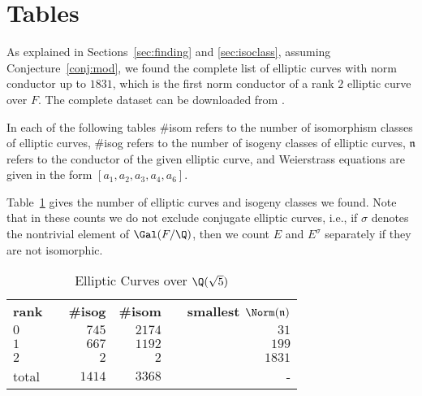 \documentclass{amsart}
\newcommand{\n}{\mathfrak{n}}
\begin{document}
\section{Tables}\label{sec:tables}

As explained in Sections~\ref{sec:finding} and \ref{sec:isoclass},
assuming Conjecture~\ref{conj:mod}, we found the complete list of
elliptic curves with norm conductor up to $1831$, which is the first
norm conductor of a rank $2$ elliptic curve over $F$. The complete
dataset can be downloaded from \cite{sqrt5data}.

In each of the following tables \#isom refers to the number of isomorphism
classes of elliptic curves, \#isog refers to the number of isogeny classes of
elliptic curves, $\n$ refers to the conductor of the given elliptic curve,
and Weierstrass equations are given in the form $[a_1,a_2,a_3,a_4,a_6]$.

Table~\ref{table:total-counts} gives the number of elliptic curves and isogeny
classes we found. Note that in these counts we do not exclude
conjugate elliptic curves, i.e., if $\sigma$ denotes the nontrivial element of
$\Gal(F/\Q)$, then we count $E$ and $E^{\sigma}$ separately if they
are not isomorphic.
\begin{center}
\begin{table}[h]
\caption{Elliptic Curves over $\Q(\sqrt{5})$\label{table:total-counts}}
\begin{tabular}{@{}lcrrcr@{}}\toprule
\textbf{rank} & \phantom{a} &\textbf{\#isog} & \textbf{\#isom} & \phantom{a} & \textbf{smallest $\Norm(\n)$} \\\cmidrule{1-1}\cmidrule{3-4}\cmidrule{6-6}
$0$   & & $745$  & $2174$ & & $31$\\
$1$   & & $667$  & $1192$ & & $199$ \\
$2$   & & $2$    & $2$    & & $1831$ \\\cmidrule{1-6}
total & & $1414$ & $3368$ & & -\; \\\bottomrule
\end{tabular}
\end{table}
\end{center}
\end{document}

